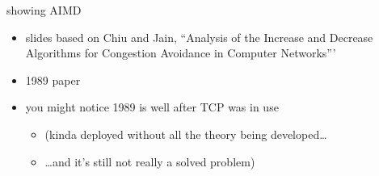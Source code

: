 
\begin{frame}{showing AIMD}
    \begin{itemize}
    \item slides based on Chiu and Jain, ``Analysis of the Increase and Decrease Algorithms for Congestion Avoidance in Computer Networks'''
    \item 1989 paper
    \vspace{.5cm}
    \item you might notice 1989 is well after TCP was in use
        \begin{itemize}
        \item (kinda deployed without all the theory being developed\ldots
        \item \ldots and it's still not really a solved problem)
        \end{itemize}
    \end{itemize}
\end{frame}
